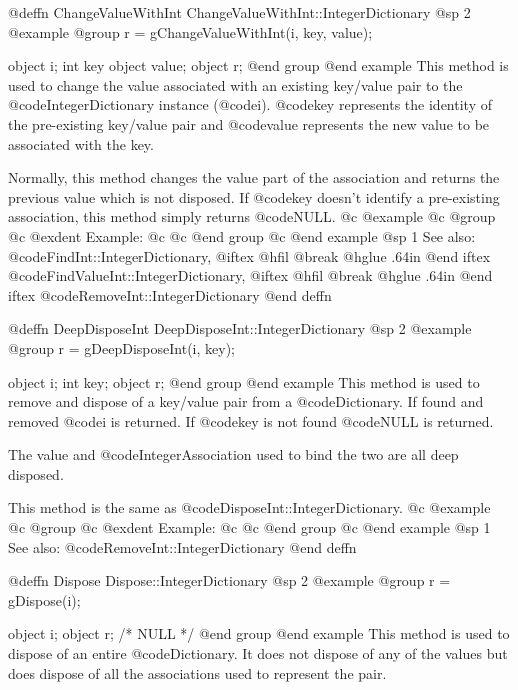 @deffn {ChangeValueWithInt} ChangeValueWithInt::IntegerDictionary
@sp 2
@example
@group
r = gChangeValueWithInt(i, key, value);

object  i;
int     key
object  value;
object  r;
@end group
@end example
This method is used to change the value associated with an existing
key/value pair to the @code{IntegerDictionary} instance (@code{i}).
@code{key} represents the identity of the pre-existing key/value
pair and @code{value} represents the new value to be associated with
the key.

Normally, this method changes the value part of the association
and returns the previous value which is not disposed.  If
@code{key} doesn't identify a pre-existing association, this method
simply returns @code{NULL}.
@c @example
@c @group
@c @exdent Example:
@c 
@c @end group
@c @end example
@sp 1
See also:  @code{FindInt::IntegerDictionary,}
@iftex
@hfil @break @hglue .64in      
@end iftex
@code{FindValueInt::IntegerDictionary,}
@iftex
@hfil @break @hglue .64in      
@end iftex
@code{RemoveInt::IntegerDictionary}
@end deffn











@deffn {DeepDisposeInt} DeepDisposeInt::IntegerDictionary
@sp 2
@example
@group
r = gDeepDisposeInt(i, key);

object  i;
int     key;
object  r;
@end group
@end example
This method is used to remove and dispose of a key/value pair from a
@code{Dictionary}.  If found and removed @code{i} is returned.  If @code{key}
is not found @code{NULL} is returned.

The value and @code{IntegerAssociation} used to bind the two are all deep
disposed.

This method is the same as @code{DisposeInt::IntegerDictionary}.
@c @example
@c @group
@c @exdent Example:
@c 
@c @end group
@c @end example
@sp 1
See also:  @code{RemoveInt::IntegerDictionary}
@end deffn













@deffn {Dispose} Dispose::IntegerDictionary
@sp 2
@example
@group
r = gDispose(i);

object  i;
object  r;     /*  NULL  */
@end group
@end example
This method is used to dispose of an entire @code{Dictionary}.  It does not
dispose of any of the values but does dispose of all the associations
used to represent the pair.  


